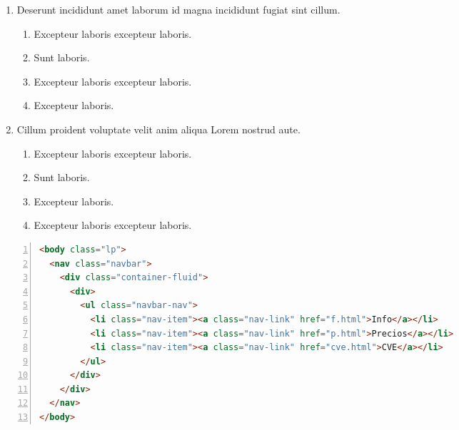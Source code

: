 \documentclass[a4paper,12pt]{article}
\begin{document}
\begin{enumerate}[label=\textbf{\arabic*.}]
\begin{multicols}{2}
\begin{enumerate}
		\item  Reprehenderit pariatur ad ipsum ea magna.
  
		\item  Eu nostrud mollit voluptate consectetur sit dolore do sit voluptate pariatur anim minim exercitation voluptate.
    
		\item  Commodo do elit eu et ex labore aliqua.
    
	\end{enumerate}

\end{multicols}
\item Deserunt incididunt amet laborum id magna incididunt fugiat sint cillum.
\begin{multicols}{2}
	\begin{enumerate}
		\item  Excepteur laboris excepteur laboris.
    
		\item  Sunt laboris.
    
		\item  Excepteur laboris excepteur laboris.
  
		\item  Excepteur laboris.
    
	\end{enumerate}

\end{multicols}
\item Cillum proident voluptate velit anim aliqua Lorem nostrud aute.
\begin{multicols}{2}
	\begin{enumerate}
		\item  Excepteur laboris excepteur laboris.
  
		\item  Sunt laboris.
    
		\item  Excepteur laboris.
    
		\item  Excepteur laboris excepteur laboris.
    
	\end{enumerate}

\end{multicols}
\end{enumerate}

\newpage
\begin{lstlisting}[language=HTML, caption={Documento en HTML}, label={lst:1}, numbers=left]
<body class="lp">
  <nav class="navbar">
    <div class="container-fluid">
      <div>
        <ul class="navbar-nav">
          <li class="nav-item"><a class="nav-link" href="f.html">Info</a></li>
          <li class="nav-item"><a class="nav-link" href="p.html">Precios</a></li>
          <li class="nav-item"><a class="nav-link" href="cve.html">CVE</a></li>
        </ul>
      </div>
    </div>
  </nav>
</body>
\end{lstlisting}
\end{document}
